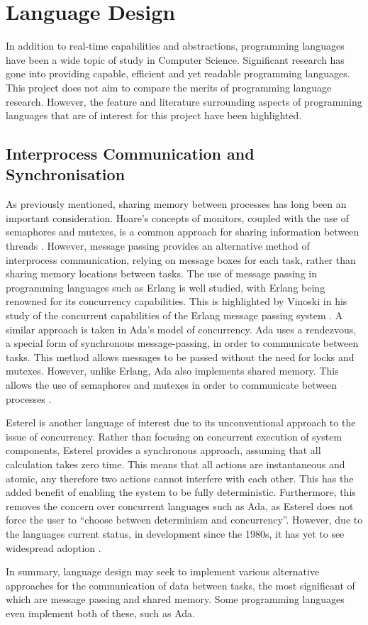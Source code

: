 \section{Language Design} 
In addition to real-time capabilities and
abstractions, programming languages have been a wide topic of study in Computer 
Science. Significant research has gone into providing
capable, efficient and yet readable programming languages. This project
does not aim to compare the merits of programming language research. However, the
feature and literature surrounding aspects of programming languages that are of
interest for this project have been highlighted. 

\subsection{Interprocess Communication and Synchronisation} %
As previously mentioned, sharing memory between processes has long been an
important consideration. Hoare's concepts of monitors, coupled with the use of semaphores
and mutexes, is a common approach for sharing information between threads
\cite{Hoare:1974:MOS:355620.361161}.  However, message passing provides an
alternative method of interprocess communication, relying on message boxes for
each task, rather than sharing memory locations between tasks.  The use of
message passing in programming languages such as Erlang is well studied, with
Erlang being renowned for its concurrency capabilities. This is highlighted by
Vinoski in his study of the concurrent capabilities of the Erlang message
passing system \cite{6216341}. A similar approach is taken in Ada's model of
concurrency. Ada uses a rendezvous, a special form of synchronous
message-passing, in order to communicate between tasks. This method allows
messages to be passed without the need for locks and mutexes. However, unlike
Erlang, Ada also implements shared memory. This allows the use of semaphores
and mutexes in order to communicate between processes
\cite{burns1998concurrency}.  
\par\bigskip\noindent
Esterel is another language of interest due to its unconventional approach to the issue of 
concurrency. Rather than focusing on concurrent execution of system components, 
Esterel provides a synchronous approach, assuming that all calculation 
takes zero time. This means that all actions are instantaneous and atomic, 
any therefore two actions cannot interfere with each other. 
This has the added benefit of enabling the system to be fully deterministic. 
Furthermore, this removes the concern over concurrent languages such as Ada, 
as Esterel does not force the user to ``choose between determinism and concurrency''.
However, due to the languages current status, in development since the 1980s, 
it has yet to see widespread adoption
\cite{esterel}.
\par\bigskip\noindent
In summary, language design
may seek to implement various alternative approaches for the communication of data
between tasks, the most significant of which are message passing and shared memory. 
Some programming languages even implement both of these, such as Ada.


